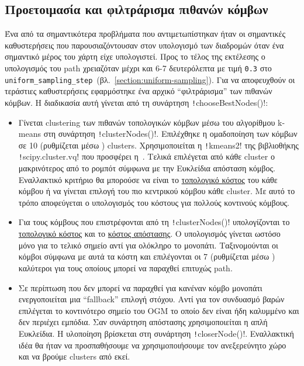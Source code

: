 \subsection{Προετοιμασία και φιλτράρισμα πιθανών κόμβων}
Ένα από τα σημαντικότερα προβλήματα που αντιμετωπίστηκαν ήταν οι σημαντικές καθυστερήσεις που παρουσιαζόντουσαν στον υπολογισμό των διαδρομών όταν ένα σημαντικό μέρος του χάρτη είχε υπολογιστεί.
Προς το τέλος της εκτέλεσης ο υπολογισμός του path χρειαζόταν μέχρι και 6-7 δευτερόλεπτα με τιμή
\texttt{0.3} στο \texttt{uniform\_sampling\_step}~(βλ.~\ref{section:uniform-sampling}).
Για να αποφευχθούν οι τεράστιες καθυστερήσεις εφαρμόστηκε ένα αρχικό ``φιλτράρισμα'' των πιθανών κόμβων.
Η διαδικασία αυτή γίνεται από τη συνάρτηση \texttt!chooseBestNodes()!:
\begin{itemize}
    \item Γίνεται clustering των πιθανών τοπολογικών κόμβων μέσω του αλγορίθμου k-means στη συνάρτηση \texttt!clusterNodes()!.
          Επιλέχθηκε η ομαδοποίηση των κόμβων σε
          10 (ρυθμίζεται μέσω ) clusters.
          Χρησιμοποιείται η \texttt!kmeans2! της βιβλιοθήκης \texttt!scipy.cluster.vq!
          που προσφέρει η~\cite{scipy}.
          Τελικά επιλέγεται από κάθε cluster ο μακρινότερος από το ρομπότ σύμφωνα με την Ευκλείδια απόσταση κόμβος.
          Εναλλακτικό κριτήριο θα μπορούσε να είναι το \hyperref[section:topo-cost]{τοπολογικό κόστος} του κάθε κόμβου ή να γίνεται επιλογή του πιο κεντρικού κόμβου κάθε cluster.
          Με αυτό το τρόπο αποφεύγεται ο υπολογισμός του κόστους για πολλούς κοντινούς κόμβους.

    \item Για τους κόμβους που επιστρέφονται από τη \texttt!clusterNodes()! υπολογίζονται το
          \hyperref[section:topo-cost]{τοπολογικό κόστος} και το \hyperref[section:distance-cost]{κόστος απόστασης}.
          Ο υπολογισμός γίνεται ωστόσο μόνο για το τελικό σημείο αντί για ολόκληρο το μονοπάτι.
          Ταξινομούνται οι κόμβοι σύμφωνα με αυτά τα κόστη και επιλέγονται οι
          7 (ρυθμίζεται μέσω ) καλύτεροι για τους οποίους μπορεί να παραχθεί επιτυχώς path.

    \item Σε περίπτωση που δεν μπορεί να παραχθεί για κανέναν κόμβο μονοπάτι ενεργοποιείται μια ``fallback'' επιλογή στόχου.
          Αντί για τον συνδυασμό βαρών επιλέγεται το κοντινότερο σημείο του OGM το οποίο δεν είναι ήδη καλυμμένο και δεν περιέχει εμπόδια.
          Σαν συνάρτηση απόστασης χρησιμοποιείται η απλή Ευκλείδια.
          Η υλοποίηση βρίσκεται στη συνάρτηση \texttt!closerNode()!.
          Εναλλακτική ιδέα θα ήταν να προσπαθήσουμε να χρησιμοποιήσουμε τον ανεξερεύνητο χώρο και να βρούμε clusters από εκεί.


\end{itemize}
